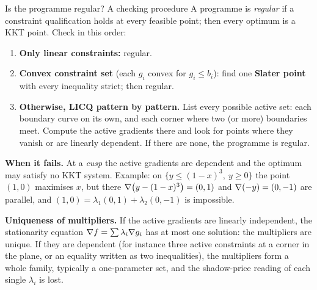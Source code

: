 \begin{rulebox}{Is the programme regular? A checking procedure}
A programme is \emph{regular} if a constraint qualification holds at
every feasible point; then every optimum is a KKT point. Check in this
order:
\begin{enumerate}[leftmargin=1.8em,itemsep=0.3ex]
  \item \textbf{Only linear constraints:} regular.
  \item \textbf{Convex constraint set} (each $g_i$ convex for $g_i\le b_i$):
        find one \textbf{Slater point} with every inequality strict; then
        regular.
  \item \textbf{Otherwise, LICQ pattern by pattern.} List every possible
        active set: each boundary curve on its own, and each corner where
        two (or more) boundaries meet. Compute the active gradients there
        and look for points where they vanish or are linearly dependent.
        If there are none, the programme is regular.
\end{enumerate}
\textbf{When it fails.} At a \emph{cusp} the active gradients are
dependent and the optimum may satisfy no KKT system. Example: on
$\{y\le(1-x)^{3},\ y\ge0\}$ the point $(1,0)$ maximises $x$, but there
$\nabla\bigl(y-(1-x)^{3}\bigr)=(0,1)$ and $\nabla(-y)=(0,-1)$ are parallel,
and $(1,0)=\lambda_1(0,1)+\lambda_2(0,-1)$ is impossible.

\textbf{Uniqueness of multipliers.} If the active gradients are linearly
independent, the stationarity equation
$\nabla f=\sum\lambda_i\nabla g_i$ has at most one solution: the multipliers
are unique. If they are dependent (for instance three active constraints at
a corner in the plane, or an equality written as two inequalities), the
multipliers form a whole family, typically a one-parameter set, and the
shadow-price reading of each single $\lambda_i$ is lost.
\end{rulebox}

